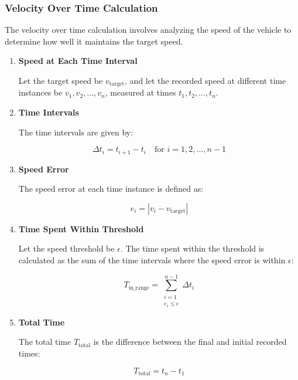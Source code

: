 \documentclass[conference]{IEEEtran}
\begin{document}
\subsubsection{Velocity Over Time Calculation}

The velocity over time calculation involves analyzing the speed of the vehicle to determine how well it maintains the target speed.

\begin{enumerate}
    \item \textbf{Speed at Each Time Interval}

    Let the target speed be $v_{\text{target}}$, and let the recorded speed at different time instances be $v_1, v_2, \ldots, v_n$, measured at times $t_1, t_2, \ldots, t_n$.

    \item \textbf{Time Intervals}

    The time intervals are given by:

    \begin{equation}
    \Delta t_i = t_{i+1} - t_i \quad \text{for } i = 1, 2, \ldots, n-1
    \end{equation}

    \item \textbf{Speed Error}

    The speed error at each time instance is defined as:

    \begin{equation}
    e_i = |v_i - v_{\text{target}}|
    \end{equation}

    \item \textbf{Time Spent Within Threshold}

    Let the speed threshold be $\epsilon$. The time spent within the threshold is calculated as the sum of the time intervals where the speed error is within $\epsilon$:

    \begin{equation}
    T_{\text{in\_range}} = \sum_{\substack{i=1 \\ e_i \leq \epsilon}}^{n-1} \Delta t_i
    \end{equation}

    \item \textbf{Total Time}

    The total time $T_{\text{total}}$ is the difference between the final and initial recorded times:

    \begin{equation}
    T_{\text{total}} = t_n - t_1
    \end{equation}


\end{enumerate}
\end{document}
